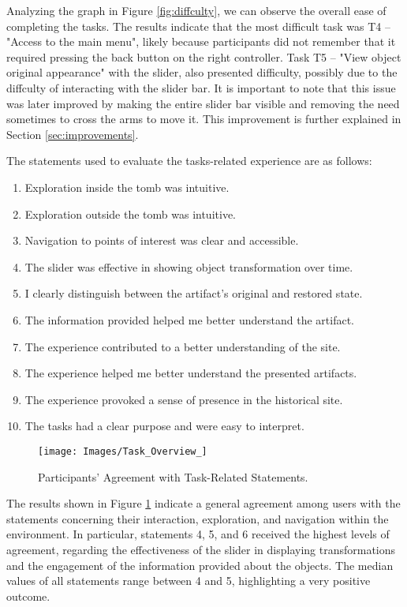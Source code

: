 Analyzing the graph in Figure \ref{fig:diffculty}, we can observe the overall ease of completing the tasks.
The results indicate that the most difficult task was T4 – "Access to the main menu", likely because participants did not remember that it required pressing the back button on the right controller. 
Task T5 – "View object original appearance" with the slider, also presented difficulty, possibly due to the diffculty of interacting with the slider bar. 
It is important to note that this issue was later improved by making the entire slider bar visible and removing the need sometimes to cross the arms to move it. 
This improvement is further explained in Section \ref{sec:improvements}.

The statements used to evaluate the tasks-related experience are as follows:

\begin{enumerate}[label=S\arabic* --]
    \item Exploration inside the tomb was intuitive.
    \item Exploration outside the tomb was intuitive.
    \item Navigation to points of interest was clear and accessible.
    \item The slider was effective in showing object transformation over time.
    \item I clearly distinguish between the artifact's original and restored state.
    \item The information provided helped me better understand the artifact.
    \item The experience contributed to a better understanding of the site.
    \item The experience helped me better understand the presented artifacts.
    \item The experience provoked a sense of presence in the historical site.
    \item The tasks had a clear purpose and were easy to interpret.
\end{enumerate}

\begin{figure}[h!]
    \centering
    \texttt{[image: Images/Task\_Overview\_]}
    \caption{Participants’ Agreement with Task-Related Statements.} 
    \label{fig:overview}
\end{figure}
\FloatBarrier


The results shown in Figure \ref{fig:overview} indicate a general agreement among users with the statements concerning their interaction, exploration, and navigation within the environment.
In particular, statements 4, 5, and 6 received the highest levels of agreement, regarding the effectiveness of the slider in displaying transformations and the engagement of the information provided about the objects.
The median values of all statements range between 4 and 5, highlighting a very positive outcome.

